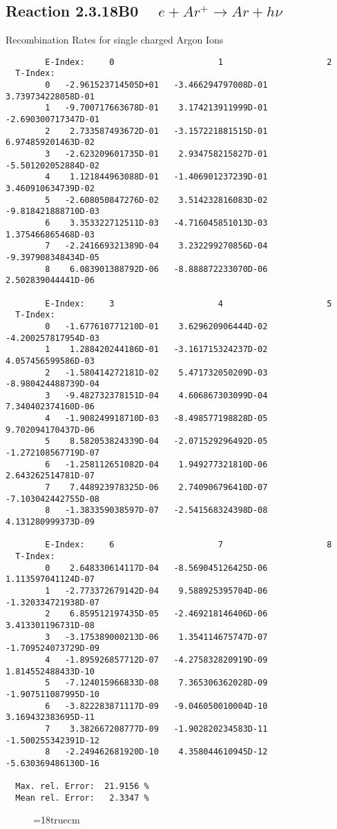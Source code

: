 \subsection{
Reaction 2.3.18B0  $ \quad e + Ar^+ \rightarrow  Ar + h\nu $
}

  Recombination Rates for single
  charged Argon Ions

\begin{verbatim}
        E-Index:     0                     1                     2
  T-Index:
        0   -2.961523714505D+01   -3.466294797008D-01    3.739734228058D-01
        1   -9.700717663678D-01    3.174213911999D-01   -2.690300717347D-01
        2    2.733587493672D-01   -3.157221881515D-01    6.974859201463D-02
        3   -2.623209601735D-01    2.934758215827D-01   -5.501202052884D-02
        4    1.121844963088D-01   -1.406901237239D-01    3.460910634739D-02
        5   -2.608050847276D-02    3.514232816083D-02   -9.818421888710D-03
        6    3.353322712511D-03   -4.716045851013D-03    1.375466865468D-03
        7   -2.241669321389D-04    3.232299270856D-04   -9.397908348434D-05
        8    6.083901388792D-06   -8.888872233070D-06    2.502839044441D-06

        E-Index:     3                     4                     5
  T-Index:
        0   -1.677610771210D-01    3.629620906444D-02   -4.200257817954D-03
        1    1.288420244186D-01   -3.161715324237D-02    4.057456599586D-03
        2   -1.580414272181D-02    5.471732050209D-03   -8.980424488739D-04
        3   -9.482732378151D-04    4.606867303099D-04    7.340402374160D-06
        4   -1.908249918710D-03   -8.498577198828D-05    9.702094170437D-06
        5    8.582053824339D-04   -2.071529296492D-05   -1.272108567719D-07
        6   -1.258112651082D-04    1.949277321810D-06    2.643262514781D-07
        7    7.448923978325D-06    2.740906796410D-07   -7.103042442755D-08
        8   -1.383359038597D-07   -2.541568324398D-08    4.131280999373D-09

        E-Index:     6                     7                     8
  T-Index:
        0    2.648330614117D-04   -8.569045126425D-06    1.113597041124D-07
        1   -2.773372679142D-04    9.588925395704D-06   -1.320334721938D-07
        2    6.859512197435D-05   -2.469218146406D-06    3.413301196731D-08
        3   -3.175389000213D-06    1.354114675747D-07   -1.709524073729D-09
        4   -1.895926857712D-07   -4.275832820919D-09    1.814552488433D-10
        5   -7.124015966833D-08    7.365306362028D-09   -1.907511087995D-10
        6   -3.822283871117D-09   -9.046050010004D-10    3.169432383695D-11
        7    3.382667208777D-09   -1.902820234583D-11   -1.500255342391D-12
        8   -2.249462681920D-10    4.358044610945D-12   -5.630369486130D-16

  Max. rel. Error:  21.9156 %
  Mean rel. Error:   2.3347 %

\end{verbatim}
\begin{figure} \label{2.3.18B0}
\epsfxsize=18truecm
\end{figure}
\newpage
